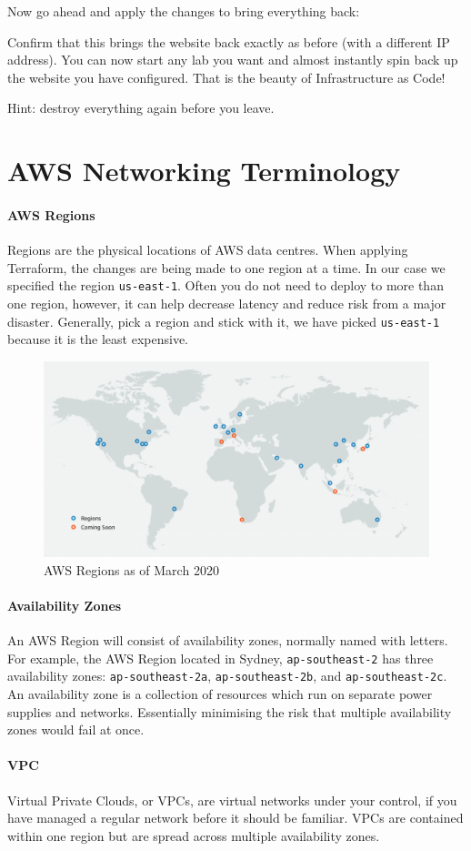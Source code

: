 \documentclass{csse4400}
\begin{document}
Now go ahead and apply the changes to bring everything back:

Confirm that this brings the website back exactly as before (with a different IP address).
You can now start any lab you want and almost instantly spin back up the website you have configured.
That is the beauty of Infrastructure as Code!

Hint: destroy everything again before you leave.




\appendix

\section{AWS Networking Terminology}
\paragraph{AWS Regions}
Regions are the physical locations of AWS data centres.
When applying Terraform, the changes are being made to one region at a time.
In our case we specified the region \texttt{us-east-1}.
Often you do not need to deploy to more than one region, however,
it can help decrease latency and reduce risk from a major disaster.
Generally, pick a region and stick with it,
we have picked \texttt{us-east-1} because it is the least expensive.

\begin{figure}[ht]
\includegraphics[width=\textwidth]{images/aws_regions}
\caption{AWS Regions as of March 2020 \cite{aws-regions}}
\end{figure}

\paragraph{Availability Zones}
An AWS Region will consist of availability zones, normally named with letters.
For example, the AWS Region located in Sydney, \texttt{ap-southeast-2} has three availability zones:
\texttt{ap-southeast-2a}, \texttt{ap-southeast-2b}, and \texttt{ap-southeast-2c}.
An availability zone is a collection of resources which run on separate power supplies and networks.
Essentially minimising the risk that multiple availability zones would fail at once.

\paragraph{VPC}
Virtual Private Clouds, or VPCs,
are virtual networks under your control,
if you have managed a regular network before it should be familiar.
VPCs are contained within one region but are spread across multiple availability zones.
\end{document}
